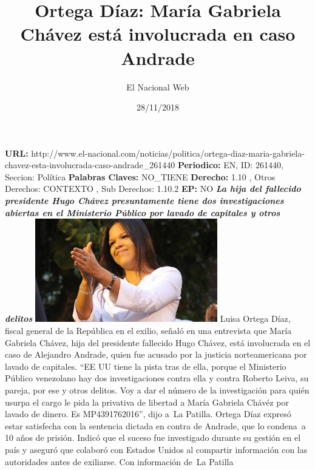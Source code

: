 \documentclass{article}%
\title{\textbf{Ortega Díaz: María Gabriela Chávez está involucrada en caso Andrade}}%
\author{El Nacional Web}%
\date{28/11/2018}%
\begin{document}
%
\normalsize%
\maketitle%
\textbf{URL: }%
http://www.el{-}nacional.com/noticias/politica/ortega{-}diaz{-}maria{-}gabriela{-}chavez{-}esta{-}involucrada{-}caso{-}andrade\_261440\newline%
%
\textbf{Periodico: }%
EN, %
ID: %
261440, %
Seccion: %
Política\newline%
%
\textbf{Palabras Claves: }%
NO\_TIENE\newline%
%
\textbf{Derecho: }%
1.10%
, Otros Derechos: %
CONTEXTO%
, Sub Derechos: %
1.10.2%
\newline%
%
\textbf{EP: }%
NO\newline%
\newline%
%
\textbf{\textit{La hija del fallecido presidente Hugo Chávez presuntamente tiene dos investigaciones abiertas en el Ministerio Público por lavado de capitales y otros delitos}}%
\newline%
\newline%
%
\includegraphics[width=300px]{182.jpg}%
\newline%
%
Luisa Ortega Díaz, fiscal general de la República en el exilio, señaló en una entrevista que María Gabriela Chávez, hija del presidente fallecido Hugo Chávez, está involucrada en el caso de Alejandro Andrade, quien fue acusado por la justicia norteamericana por lavado de capitales.%
\newline%
%
“EE UU tiene la pista tras de ella, porque el Ministerio Público venezolano hay dos investigaciones contra ella y contra Roberto Leiva, su pareja, por ese y otros delitos. Voy a dar el número de la investigación para quién usurpa el cargo le pida la privativa de libertad a María Gabriela Chávéz por lavado de dinero. Es MP4391762016”, dijo a~La Patilla.%
\newline%
%
Ortega Díaz expresó estar satisfecha con la sentencia dictada en contra de Andrade, que lo condena~a 10 años de prisión.%
\newline%
%
Indicó que el suceso fue investigado durante su gestión en el país y aseguró que colaboró con Estados Unidos al compartir información con las autoridades antes de exiliarse.%
\newline%
%
Con información de~La Patilla%
\newline%
%
\end{document}
